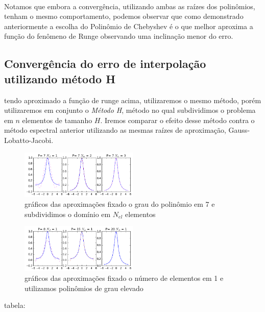 \\
Notamos que embora a convergência, utilizando ambas as raízes dos polinômios, tenham o mesmo comportamento, podemos observar que como demonstrado  anteriormente a escolha do Polinômio de Chebyshev é o que melhor aproxima a função do fenômeno de Runge observando uma inclinação menor do erro.

\subsection{Convergência do erro de interpolação utilizando método H}
 tendo aproximado a função de runge acima, utilizaremos o mesmo método, porém utilizaremos em conjunto o \emph{Método H}, método no qual subdividimos o problema em $n$ elementos de tamanho $H$. Iremos comparar o efeito desse método contra o método espectral anterior utilizando as mesmas raízes de aproximação, Gauss-Lobatto-Jacobi.
\begin{figure}[!ht]
  \includegraphics[width=0.5\textwidth,center]{figuras/interp_usando_FEM.png}
  \caption{gráficos das aproximações fixado o grau do polinômio em 7 e subdividimos o domínio em $N_{el}$ elementos }
\end{figure}
\begin{figure}[!hb]
  \includegraphics[width=0.5\textwidth,center]{figuras/interp_usando_FEMfixo.png}
  \caption{gráficos das aproximações fixado o número de elementos em 1 e utilizamos polinômios de grau elevado}
\end{figure}
tabela:
